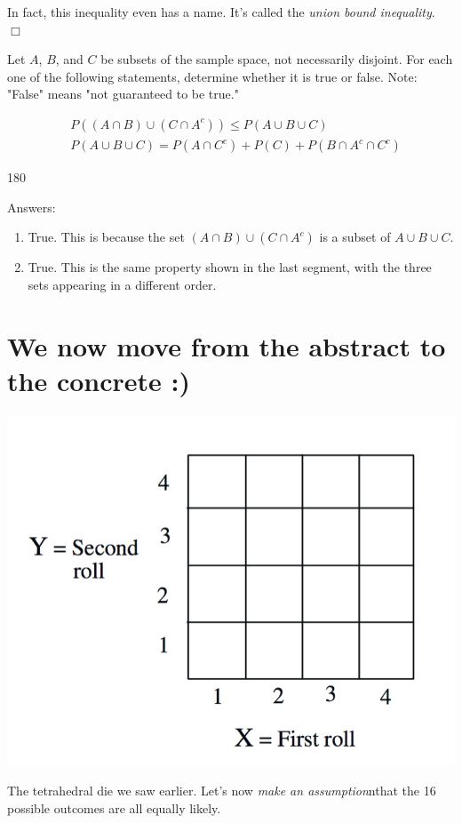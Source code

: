 \documentclass{tufte-handout}
\begin{document}
In fact, this inequality even has a name. It's called the \textit{union bound inequality}. $\Box$


Let $A$, $B$, and $C$ be subsets of the sample space, not necessarily disjoint. For each one of the following statements, determine whether it is true or false. Note: "False" means "not guaranteed to be true."

\setcounter{equation}{0}
\begin{align}
&P((A \cap B) \cup (C \cap A^c)) \leq P(A \cup B \cup C) \\
&P(A \cup B \cup C) = P(A \cap C^c) + P(C) + P(B \cap A^c \cap C^c)
\end{align}

\vspace{1cm}

\begin{turn}{180} 
\color{teal}
\begin{minipage}{\linewidth}
Answers:
\scriptsize
\begin{enumerate}[(1)]
\item  True. This is because the set $(A \cap B) \cup (C \cap A^c)$ is a subset of $A \cup B \cup C$.
\item  True. This is the same property shown in the last segment, with the three sets appearing in a different order.
\end{enumerate}
\end{minipage}
\end{turn}


\pagebreak
\section{We now move from the abstract to the concrete :)}\label{sec:model-building}

\begin{marginfigure}
  \includegraphics{TetraDie}
  \caption{The tetrahedral die we saw earlier. Let's now \textit{make an assumption}nthat the 16 possible outcomes are all
equally likely.}
\end{marginfigure}
\end{document}
